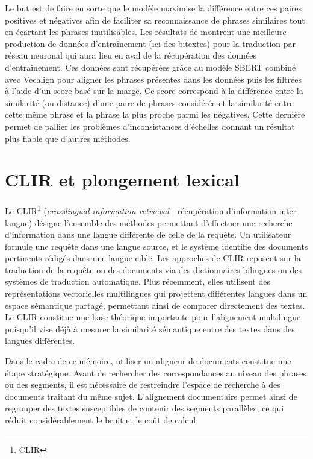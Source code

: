 Le but est de faire en sorte que le modèle maximise la différence entre ces paires positives et négatives afin
de faciliter sa reconnaissance de phrases similaires tout en écartant les phrases inutilisables.
Les résultats de \citet{tan_2022} montrent une meilleure production de données d'entraînement (ici des bitextes)
pour la traduction par réseau neuronal qui aura lieu en aval de la récupération des données d'entraînement.
Ces données sont récupérées grâce au modèle SBERT \citep{reimers_2019}
combiné avec Vecalign pour aligner les phrases présentes dans les données puis les filtrées à l'aide d'un score basé sur la marge. 
Ce score correspond à la différence entre la similarité (ou distance) d’une paire de phrases considérée et la similarité
entre cette même phrase et la phrase la plus proche parmi les négatives. Cette dernière permet de pallier les problèmes
d'inconsistances d'échelles donnant un résultat plus fiable que d'autres méthodes.

\section{CLIR et plongement lexical}

Le CLIR\footnote{\gls{CLIR}} (\textit{crosslingual information retrieval} - 
récupération d'information inter-langue) désigne l’ensemble des méthodes permettant
d’effectuer une recherche d’information dans une langue différente de celle de la requête.
Un utilisateur formule une requête dans une langue source, et le système
identifie des documents pertinents rédigés dans une langue cible. Les approches de CLIR
reposent sur la traduction de la requête ou des documents via des dictionnaires
bilingues ou des systèmes de traduction automatique. Plus récemment, elles utilisent des
représentations vectorielles multilingues qui projettent différentes langues dans un espace sémantique partagé,
permettant ainsi de comparer directement des textes. Le CLIR
constitue une base théorique importante pour l’alignement multilingue, puisqu’il vise déjà
à mesurer la similarité sémantique entre des textes dans des langues différentes.

Dans le cadre de ce mémoire, utiliser
un aligneur de documents constitue une étape stratégique. Avant de rechercher
des correspondances au niveau des phrases ou des segments, il est nécessaire de restreindre
l’espace de recherche à des documents traitant du même sujet. L’alignement documentaire permet
ainsi de regrouper des textes susceptibles de contenir des segments parallèles, ce qui réduit
considérablement le bruit et le coût de calcul.

